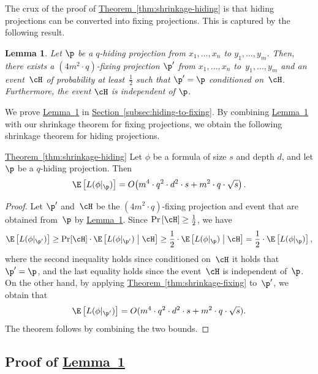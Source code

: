 \documentclass[11pt]{article}
\numberwithin{equation}{section}
\newtheorem{lemma}[theorem]{Lemma}
\theoremstyle{definition}
\theoremstyle{plain}
\newcommand{\expref}[2]{\hyperref[#2]{#1~\ref{#2}}}
\theoremstyle{definition}\newtheorem{notation}[theorem]{Notation}\theoremstyle{plain}
\begin{document}
The crux of the proof of \expref{Theorem}{thm:shrinkage-hiding} is that hiding projections
can be converted into fixing projections. This is captured by the
following result. 
\begin{lemma}
\label{lemma:hiding-to-fixing}Let $\p$ be a $q$-hiding projection from
$x_{1},\ldots,x_{n}$ to $y_{1},\ldots,y_{m}$. Then, there exists
a $(4m^{2}\cdot q)$-fixing projection $\p'$ from $x_{1},\ldots,x_{n}$
to~$y_{1},\ldots,y_{m}$ and an event~$\cH$ of probability at least~$\frac{1}{2}$
such that $\p'=\p$ conditioned on~$\cH$. Furthermore, the event
$\cH$ is independent of $\p$.
\end{lemma}

We prove \expref{Lemma}{lemma:hiding-to-fixing} in \expref{Section}{subsec:hiding-to-fixing}.
By combining \expref{Lemma}{lemma:hiding-to-fixing} with our shrinkage theorem for
fixing projections, we obtain the following shrinkage theorem for
hiding projections. 
\begin{restated}{\expref{Theorem}{thm:shrinkage-hiding}}
Let $\phi$ be a formula of size $s$ and depth $d$, and let $\p$
be a $q$-hiding projection. Then 
\[
\E\left[L(\phi|_{\p})\right]=O\!\left(m^{4}\cdot q^{2}\cdot d^{2}\cdot s+m^{2}\cdot q\cdot\sqrt{s}\right).
\]
\end{restated}

\begin{proof}
Let $\p'$ and~$\cH$ be the $(4m^{2}\cdot q)$-fixing projection
and event that are obtained from~$\p$ by \expref{Lemma}{lemma:hiding-to-fixing}.
Since $\Pr\left[\cH\right]\geq\frac{1}{2}$, we have 
\[
\E\left[L(\phi|_{\p'})\right]\geq\Pr\!\left[\cH\right]\cdot\E\left[L(\phi|_{\p'})\;\middle|\;\cH\right]\geq\frac{1}{2}\cdot\E\left[L(\phi|_{\p})\;\middle|\;\cH\right]=\frac{1}{2}\cdot\E\left[L(\phi|_{\p})\right],
\]
where the second inequality holds since conditioned on~$\cH$ it
holds that $\p'=\p$, and the last equality holds since the event~$\cH$
is independent of~$\p$. On the other hand, by applying 
\expref{Theorem}{thm:shrinkage-fixing}
to~$\p'$, we obtain that 
\[
\E\left[L(\phi|_{\p'})\right]=O(m^{4}\cdot q^{2}\cdot d^{2}\cdot s+m^{2}\cdot q\cdot\sqrt{s}).
\]
The theorem follows by combining the two bounds. 
\end{proof}

\subsection{\label{subsec:hiding-to-fixing}Proof of \expref{Lemma}{lemma:hiding-to-fixing}}
\end{document}
